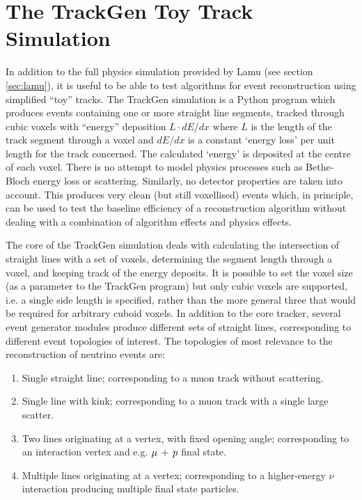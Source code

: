 \section{The TrackGen Toy Track Simulation}
In addition to the full physics simulation provided by Lamu (see section \ref{sec:lamu}), it is useful to be able to test algorithms for event reconstruction using simplified ``toy'' tracks. The TrackGen simulation is a Python program which produces events containing one or more straight line segments, tracked through cubic voxels with ``energy'' deposition $L\cdot dE/dx$ where $L$ is the length of the track segment through a voxel and $dE/dx$ is a constant `energy loss' per unit length for the track concerned. The calculated `energy' is deposited at the centre of each voxel. There is no attempt to model physics processes such as Bethe-Bloch energy loss or scattering. Similarly, no detector properties are taken into account. This produces very clean (but still voxellised) events which, in principle, can be used to test the baseline efficiency of a reconstruction algorithm without dealing with a combination of algorithm effects and physics effects.

The core of the TrackGen simulation deals with calculating the intersection of straight lines with a set of voxels, determining the segment length through a voxel, and keeping track of the energy deposits. It is possible to set the voxel size (as a parameter to the TrackGen program) but only cubic voxels are supported, i.e. a single side length is specified, rather than the more general three that would be required for arbitrary cuboid voxels. In addition to the core tracker, several event generator modules produce different sets of straight lines, corresponding to different event topologies of interest. The topologies of most relevance to the reconstruction of neutrino events are:

\begin{enumerate}
    \item Single straight line; corresponding to a muon track without scattering.
    \item Single line with kink; corresponding to a muon track with a single large scatter.
    \item Two lines originating at a vertex, with fixed opening angle; corresponding to an interaction vertex and e.g. $\mu\,+\,p$ final state.
    \item Multiple lines originating at a vertex; corresponding to a higher-energy $\nu$ interaction producing multiple final state particles.
\end{enumerate}

